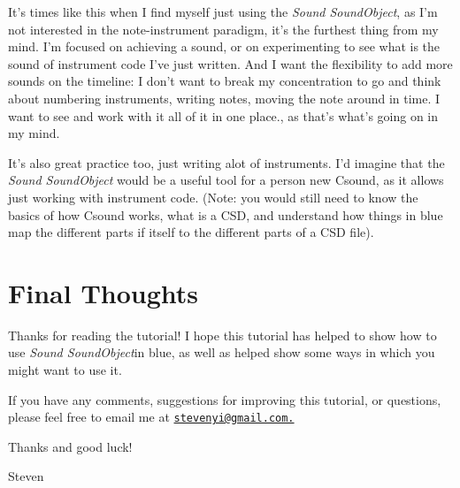 It's times like this when I find myself just using the \emph{Sound
SoundObject}, as I'm not interested in the note-instrument paradigm,
it's the furthest thing from my mind. I'm focused on achieving a sound,
or on experimenting to see what is the sound of instrument code I've
just written. And I want the flexibility to add more sounds on the
timeline: I don't want to break my concentration to go and think about
numbering instruments, writing notes, moving the note around in time. I
want to see and work with it all of it in one place., as that's what's
going on in my mind.

It's also great practice too, just writing alot of instruments. I'd
imagine that the \emph{Sound SoundObject} would be a useful tool for a
person new Csound, as it allows just working with instrument code.
(Note: you would still need to know the basics of how Csound works, what
is a CSD, and understand how things in blue map the different parts if
itself to the different parts of a CSD file).

\section{Final Thoughts}

Thanks for reading the tutorial! I hope this tutorial has helped to show
how to use \emph{Sound SoundObject}in blue, as well as helped show some
ways in which you might want to use it.

If you have any comments, suggestions for improving this tutorial, or
questions, please feel free to email me at
\href{mailto:stevenyi@gmail.com.}{\nolinkurl{stevenyi@gmail.com.}}

Thanks and good luck!

Steven
